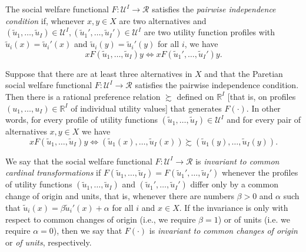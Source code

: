\begin{defn}
    The social welfare functional $F : \mathscr{U}^I \to \mathscr{R}$ satisfies the \emph{pairwise independence condition} if, whenever $x, y \in X$ are two alternatives and $(\tilde{u}_1, \dots, \tilde{u}_I) \in \mathscr{U}^I, (\tilde{u}_1', \dots, \tilde{u}_I') \in \mathscr{U}^I$ are two utility function profiles with $\tilde{u}_i (x) = \tilde{u}_i' (x)$ and $\tilde{u}_i (y) = \tilde{u}_i' (y)$ for all $i$, we have
    \begin{equation*}
        x F (\tilde{u}_1, \dots, \tilde{u}_I) y \iff x F (\tilde{u}_1', \dots, \tilde{u}_I') y.
    \end{equation*}
\end{defn}

\begin{prop}
    Suppose that there are at least three alternatives in $X$ and that the Paretian social welfare functional $F: \mathscr{U}^I \to \mathscr{R}$ satisfies the pairwise independence condition. Then there is a rational preference relation $\succsim$ defined on $\mathbb{R}^I$ [that is, on profiles $(u_1, \dots, u_I) \in \mathbb{R}^I$ of individual utility values] that generates $F(\cdot)$. In other words, for every profile of utility functions $(\tilde{u}_1, \dots, \tilde{u}_I) \in \mathscr{U}^I$ and for every pair of alternatives $x, y \in X$ we have
    \begin{equation*}
        x F (\tilde{u}_1, \dots, \tilde{u}_I) y \iff (\tilde{u}_1 (x), \dots, \tilde{u}_I (x)) \succsim (\tilde{u}_1 (y), \dots, \tilde{u}_I (y)).
    \end{equation*}
\end{prop}

\begin{defn}
    We say that the social welfare functional $F : \mathscr{U}^I \to \mathscr{R}$ is \emph{invariant to common cardinal transformations} if $F (\tilde{u}_1, \dots, \tilde{u}_I) = F (\tilde{u}_1', \dots, \tilde{u}_I')$ whenever the profiles of utility functions $(\tilde{u}_1, \dots, \tilde{u}_I)$ and $(\tilde{u}_1', \dots, \tilde{u}_I')$ differ only by a common change of origin and units, that is, whenever there are numbers $\beta > 0$ and $\alpha$ such that $\tilde{u}_i (x) = \beta \tilde{u}_i' (x) + \alpha$ for all $i$ and $x \in X$. If the invariance is only with respect to common changes of origin (i.e., we require $\beta = 1$) or of units (i.e. we require $\alpha = 0$), then we say that $F(\cdot)$ is \emph{invariant to common changes of origin} or \emph{of units}, respectively.
\end{defn}

